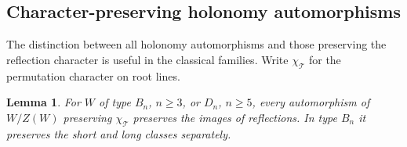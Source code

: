 \documentclass[11pt]{article}
\newtheorem{lemma}[theorem]{Lemma}
\theoremstyle{definition}
\newcommand{\T}{\mathcal{T}}
\begin{document}
\subsection{Character-preserving holonomy automorphisms}\label{sec:classical-quotients}

The distinction between all holonomy automorphisms and those preserving the reflection character is
useful in the classical families. Write $\chi_\T$ for the permutation character on root lines.

\begin{lemma}\label{lem:classical-character}
For $W$ of type $B_n$, $n\ge3$, or $D_n$, $n\ge5$, every automorphism of $W/Z(W)$ preserving
$\chi_\T$ preserves the images of reflections. In type $B_n$ it preserves the short and long classes separately.
\end{lemma}
\end{document}
